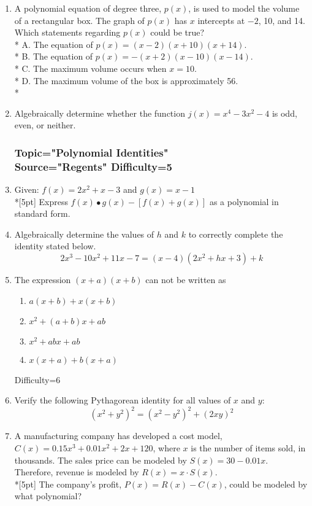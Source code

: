 \documentclass[12pt, oneside]{article}
\begin{document}
\begin{enumerate}
\item A polynomial equation of degree three, $p(x)$, is used to model the volume of a rectangular box. The graph of $p(x)$ has $x$ intercepts at  $-2$, 10, and 14. Which statements regarding $p(x)$ could be true?\\*
A. The equation of $p(x) = (x - 2)(x + 10)(x +14)$.\\*
B. The equation of $p(x) = -(x + 2)(x - 10)(x - 14)$.\\*
C. The maximum volume occurs when $x = 10$.\\*
D. The maximum volume of the box is approximately 56.\\* %

\item Algebraically determine whether the function $j(x) = x^4- 3x^2- 4$ is odd, even, or neither. %

\subsubsection*{Topic="Polynomial Identities"\\
Source="Regents" 
Difficulty=5}

\item Given: $f(x)=2x^2+ x - 3$ and $g(x)=x-1$\\*[5pt]
Express $f(x) \bullet g(x) - [f(x) + g(x)]$ as a polynomial in standard form. %

\item Algebraically determine the values of $h$ and $k$ to correctly complete the identity stated below.
\[2x^3-10x^2+11x-7=(x-4)(2x^2+hx+3)+k\] %

\item The expression $(x + a)(x + b)$ can not be written as
\begin{enumerate}
    \item $a(x + b)+ x(x + b)$
    \item $x^2 + (a + b)x + ab$ 
    \item  $x^2 + abx + ab$  
    \item $x(x + a)+ b(x + a)$
\end{enumerate}

Difficulty=6
\item Verify the following Pythagorean identity for all values of $x$ and $y$: \[(x^2 + y^2)^2= (x^2- y^2)^2+ (2xy)^2\] %

\item A manufacturing company has developed a cost model, $C(x)=0.15x^3+0.01x^2+2x+120$, where $x$ is the number of items sold, in thousands. The sales price can be modeled by $S(x)=30-0.01x$. Therefore, revenue is modeled by $R(x)=x \cdot S(x)$.\\*[5pt]
The company’s profit, $P(x)=R(x)-C(x)$, could be modeled by what polynomial?  %


\end{enumerate}
\end{document}
